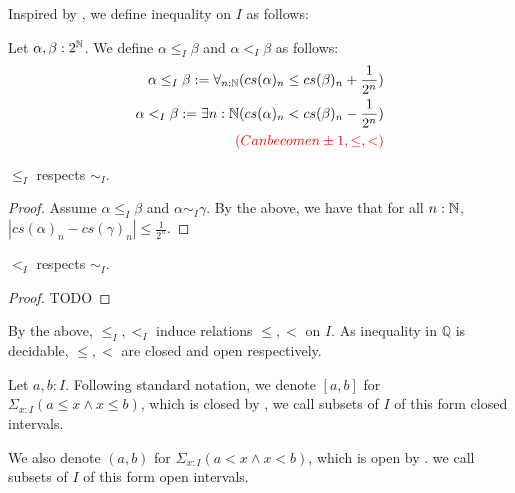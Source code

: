 Inspired by \Cite{Bishop}, we define inequality on $I$ as follows:
\begin{definition}
  Let $\alpha,\beta:2^{\mathbb{N}}$. 
  We define $\alpha\leq_I \beta$ and $\alpha<_I\beta$ as follows:
  \begin{align}
  \alpha\leq_I\beta : = \forall_{n:\mathbb{N}} ( cs(\alpha)_n \leq cs(\beta)_n + \frac {1} {2^n})\\ 
    \alpha   <_I \beta : = \exists{n:\mathbb{N}} ( cs(\alpha)_n < cs(\beta)_n - \frac {1} {2^n})
    \\{\color{red}(Can become n\pm1, \leq ,< )}
\end{align}
\end{definition}


\begin{lemma}
  $\leq_I$ respects $\sim_I$. 
\end{lemma}
\begin{proof}
  Assume $\alpha\leq_I \beta$ and $\alpha\sim_I\gamma$. 
  By the above, we have that for all $n:\mathbb{N}$, 
  $|cs(\alpha)_n - cs(\gamma)_n |\leq \frac{1}{2^n}$. 


%  
\end{proof}
\begin{lemma}
  $<_I$ respects $\sim_I$. 
\end{lemma} 
\begin{proof}
  TODO
\end{proof}
\begin{remark}
  By the above, $\leq_I, <_I$ induce relations $\leq,<$ on $I$.
  As inequality in $\mathbb Q$ is decidable, $\leq, <$ are closed and open respectively. 

  Let $a,b:I$. Following standard notation, we denote
  $[a,b]$ for $\Sigma_{x:I} (a\leq x \wedge x \leq b)$, which is closed by , 
  we call subsets of $I$ of this form closed intervals. 


  We also denote $(a,b)$ for $\Sigma_{x:I} (a < x \wedge x < b)$, which is open by .
  we call subsets of $I$ of this form open intervals. 
\end{remark}


